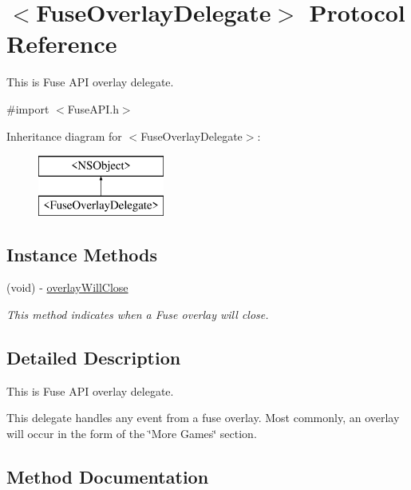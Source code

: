 \hypertarget{protocol_fuse_overlay_delegate-p}{}\section{$<$Fuse\+Overlay\+Delegate$>$ Protocol Reference}
\label{protocol_fuse_overlay_delegate-p}


This is Fuse A\+P\+I overlay delegate.  




{\ttfamily \#import $<$Fuse\+A\+P\+I.\+h$>$}

Inheritance diagram for $<$Fuse\+Overlay\+Delegate$>$\+:\begin{figure}[H]
\begin{center}
\leavevmode
\includegraphics[height=2.000000cm]{protocol_fuse_overlay_delegate-p}
\end{center}
\end{figure}
\subsection*{Instance Methods}
\begin{DoxyCompactItemize}
\item 
(void) -\/ \hyperlink{protocol_fuse_overlay_delegate-p_a45f598193363390e2d50f9cec694be35}{overlay\+Will\+Close}
\begin{DoxyCompactList}\small\item\em This method indicates when a Fuse overlay will close. \end{DoxyCompactList}\end{DoxyCompactItemize}


\subsection{Detailed Description}
This is Fuse A\+P\+I overlay delegate. 

This delegate handles any event from a fuse overlay. Most commonly, an overlay will occur in the form of the \char`\"{}\+More Games\char`\"{} section. 

\subsection{Method Documentation}
\hypertarget{protocol_fuse_overlay_delegate-p_a45f598193363390e2d50f9cec694be35}{}
